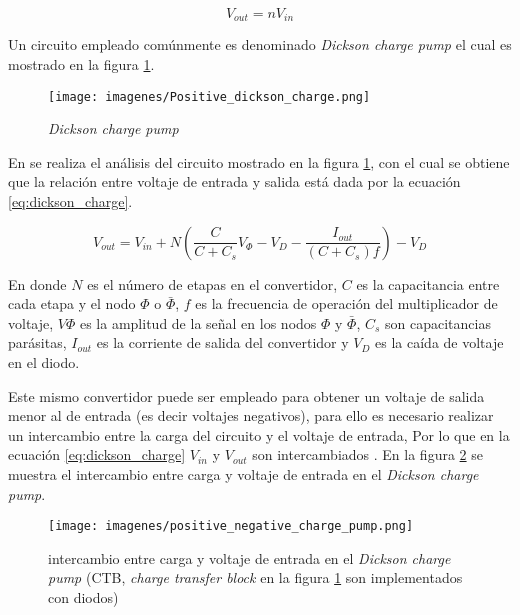     \begin{equation}
        V_{out} = n V_{in}
        \label{eq:charge_pump}
    \end{equation}
    
    Un circuito empleado comúnmente es denominado \textit{
    Dickson charge pump} el cual es mostrado en la figura \ref{fig:dickson_charge}.
    
    \begin{figure}[H]
        \centering
        \texttt{[image: imagenes/Positive\_dickson\_charge.png]}
        \caption{\textit{ Dickson charge pump} \cite{charge_dikson}}
        \label{fig:dickson_charge}
    \end{figure}

    En \cite{charge_dikson} se realiza el análisis del circuito mostrado
    en la figura \ref{fig:dickson_charge}, con
    el cual se obtiene que la relación entre voltaje de entrada y salida está dada
    por la ecuación \ref{eq:dickson_charge}.

    \begin{equation}
        V_{out} = V_{in} + N \left (  \frac{C}{C+C_s}V_\Phi - V_D - 
        \frac{I_{out}}{(C+C_s)f} \right ) - V_D
        \label{eq:dickson_charge}
    \end{equation}

    En donde $N$ es el número de etapas en el convertidor, $C$ es la capacitancia
    entre cada etapa y el nodo $\Phi$ o $\bar{\Phi}$, $f$ es la frecuencia de 
    operación del multiplicador de voltaje, $V{\Phi}$ es la amplitud
    de la señal en los nodos $\Phi$ y $\bar{\Phi}$, $C_s$ son capacitancias parásitas,
    $I_{out}$ es la corriente de salida del
    convertidor y $V_D$ es la caída de voltaje en el diodo.

    Este mismo convertidor puede ser empleado para obtener un voltaje de salida
    menor al de entrada (es decir voltajes negativos), para ello es necesario
    realizar un intercambio entre la carga del circuito y el voltaje de entrada,
    Por lo que en la ecuación \ref{eq:dickson_charge} $V_{in}$ y $V_{out}$
    son intercambiados \cite{mohammad_switched_2010}. En la figura 
    \ref{fig:dickson_charge_bid} se muestra el intercambio entre carga y 
    voltaje de entrada en el \textit{Dickson charge pump}.
    
    \begin{figure}[H]
        \centering
        \texttt{[image: imagenes/positive\_negative\_charge\_pump.png]}
        \caption{intercambio entre carga y voltaje de entrada en el
                 \textit{Dickson charge pump} (CTB, \textit{charge transfer
                 block} en la figura \ref{fig:dickson_charge} son implementados
                 con diodos) \cite{mohammad_switched_2010}}
        \label{fig:dickson_charge_bid}
    \end{figure}

